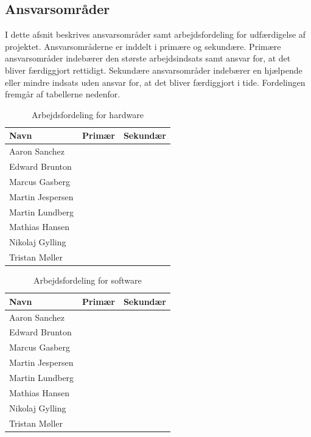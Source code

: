 \documentclass[Rapport/Rapport_main.tex]{subfiles}
\begin{document}
\subsection{Ansvarsområder}
I dette afsnit beskrives ansvarsområder samt arbejdsfordeling for udfærdigelse af projektet. Ansvarsområderne er inddelt i primære og sekundære. Primære ansvarsområder indebærer den største arbejdsindsats samt ansvar for, at det bliver færdiggjort rettidigt. Sekundære ansvarsområder indebærer en hjælpende eller mindre indsats uden ansvar for, at det bliver færdiggjort i tide. Fordelingen fremgår af tabellerne nedenfor.

\begin{table}[H]
\centering
\begin{tabular}{|L{0.3\textwidth}|L{0.3\textwidth}|L{0.3\textwidth}|}
\hline
\textbf{Navn} & \textbf{Primær} & \textbf{Sekundær} \\ \hline
Aaron Sanchez & & \\ \hline
Edward Brunton & & \\ \hline
Marcus Gasberg & & \\ \hline
Martin Jespersen & & \\ \hline
Martin Lundberg & & \\ \hline
Mathias Hansen & & \\ \hline
Nikolaj Gylling & & \\ \hline
Tristan Møller & & \\ \hline
\end{tabular}
\caption{Arbejdsfordeling for hardware}
\label{tab:fordeling_HW}
\end{table}

\begin{table}[H]
\centering
\begin{tabular}{|L{0.3\textwidth}|L{0.3\textwidth}|L{0.3\textwidth}|}
\hline
\textbf{Navn} & \textbf{Primær} & \textbf{Sekundær} \\ \hline
Aaron Sanchez & & \\ \hline
Edward Brunton & & \\ \hline
Marcus Gasberg & & \\ \hline
Martin Jespersen & & \\ \hline
Martin Lundberg & & \\ \hline
Mathias Hansen & & \\ \hline
Nikolaj Gylling & & \\ \hline
Tristan Møller & & \\ \hline
\end{tabular}
\caption{Arbejdsfordeling for software}
\label{tab:fordeling_SW}
\end{table}
\end{document}
